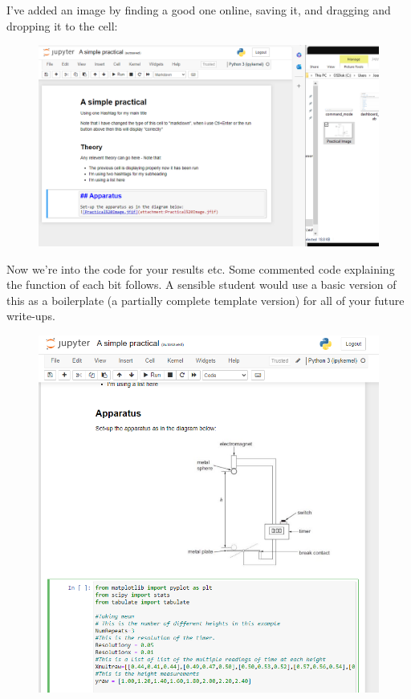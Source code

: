 I've added an image by finding a good one online, saving it, and dragging and dropping it to the cell:\\
\begin{figure}[h!]
    \centering
    \includegraphics[width=1\linewidth]{figures/pracimage.png}
\end{figure}
Now we're into the code for your results etc. Some commented code explaining the function of each bit follows. A sensible student would use a basic version of this as a boilerplate (a partially complete template version) for all of your future write-ups.\\ 

\begin{figure}[h!]
    \centering
    \includegraphics[width=1\linewidth]{figures/praccode.png}
\end{figure}
\newpage
